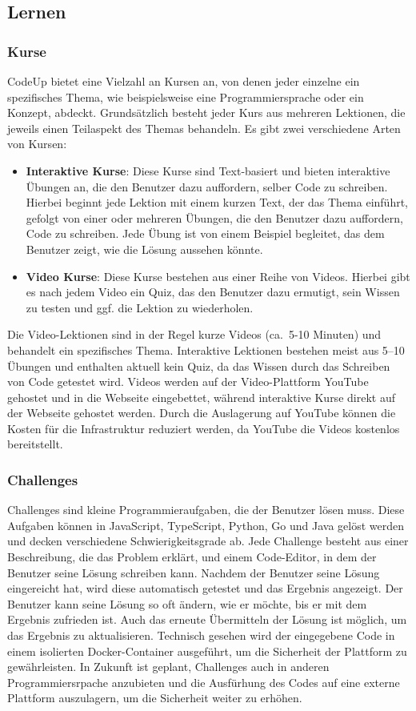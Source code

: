 \documentclass[main.tex]{subfiles}
\begin{document}
    \subsection{Lernen}
    \subsubsection{Kurse}
    CodeUp bietet eine Vielzahl an Kursen an, von denen jeder einzelne ein spezifisches Thema, wie beispielsweise eine Programmiersprache oder ein Konzept, abdeckt.
    Grundsätzlich besteht jeder Kurs aus mehreren Lektionen, die jeweils einen Teilaspekt des Themas behandeln.
    Es gibt zwei verschiedene Arten von Kursen:
    \begin{itemize}
        \item \textbf{Interaktive Kurse}: Diese Kurse sind Text-basiert und bieten interaktive Übungen an, die den Benutzer dazu auffordern, selber Code zu schreiben.
        Hierbei beginnt jede Lektion mit einem kurzen Text, der das Thema einführt, gefolgt von einer oder mehreren Übungen, die den Benutzer dazu auffordern, Code zu schreiben.
        Jede Übung ist von einem Beispiel begleitet, das dem Benutzer zeigt, wie die Lösung aussehen könnte.
        \item \textbf{Video Kurse}: Diese Kurse bestehen aus einer Reihe von Videos.
        Hierbei gibt es nach jedem Video ein Quiz, das den Benutzer dazu ermutigt, sein Wissen zu testen und ggf. die Lektion zu wiederholen.
    \end{itemize}
    Die Video-Lektionen sind in der Regel kurze Videos (ca.~5-10 Minuten) und behandelt ein spezifisches Thema.
    Interaktive Lektionen bestehen meist aus 5--10 Übungen und enthalten aktuell kein Quiz, da das Wissen durch das Schreiben von Code getestet wird.
    Videos werden auf der Video-Plattform YouTube gehostet und in die Webseite eingebettet, während interaktive Kurse direkt auf der Webseite gehostet werden.
    Durch die Auslagerung auf YouTube können die Kosten für die Infrastruktur reduziert werden, da YouTube die Videos kostenlos bereitstellt.
    \subsubsection{Challenges}
    Challenges sind kleine Programmieraufgaben, die der Benutzer lösen muss.
    Diese Aufgaben können in JavaScript, TypeScript, Python, Go und Java gelöst werden und decken verschiedene Schwierigkeitsgrade ab.
    Jede Challenge besteht aus einer Beschreibung, die das Problem erklärt, und einem Code-Editor, in dem der Benutzer seine Lösung schreiben kann.
    Nachdem der Benutzer seine Lösung eingereicht hat, wird diese automatisch getestet und das Ergebnis angezeigt.
    Der Benutzer kann seine Lösung so oft ändern, wie er möchte, bis er mit dem Ergebnis zufrieden ist.
    Auch das erneute Übermitteln der Lösung ist möglich, um das Ergebnis zu aktualisieren.
    Technisch gesehen wird der eingegebene Code in einem isolierten Docker-Container ausgeführt, um die Sicherheit der Plattform zu gewährleisten.
    In Zukunft ist geplant, Challenges auch in anderen Programmiersrpache anzubieten und die Ausfürhung des Codes auf eine externe Plattform auszulagern, um die Sicherheit weiter zu erhöhen.
\end{document}
